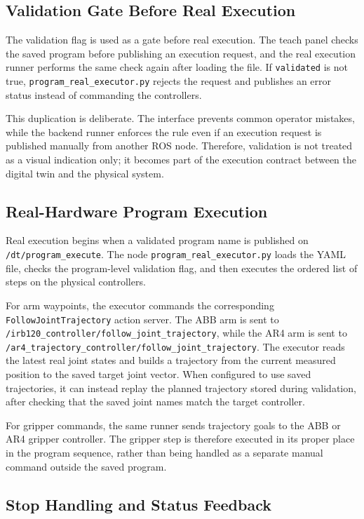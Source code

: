 \subsection{Validation Gate Before Real Execution}

The validation flag is used as a gate before real execution. The teach panel checks the saved program before publishing an execution request, and the real execution runner performs the same check again after loading the file. If \texttt{validated} is not true, \texttt{program\_real\_executor.py} rejects the request and publishes an error status instead of commanding the controllers.

This duplication is deliberate. The interface prevents common operator mistakes, while the backend runner enforces the rule even if an execution request is published manually from another ROS node. Therefore, validation is not treated as a visual indication only; it becomes part of the execution contract between the digital twin and the physical system.

\subsection{Real-Hardware Program Execution}

Real execution begins when a validated program name is published on \texttt{/dt/program\_execute}. The node \texttt{program\_real\_executor.py} loads the YAML file, checks the program-level validation flag, and then executes the ordered list of steps on the physical controllers.

For arm waypoints, the executor commands the corresponding \texttt{FollowJointTrajectory} action server. The ABB arm is sent to \texttt{/irb120\_controller/follow\_joint\_trajectory}, while the AR4 arm is sent to \texttt{/ar4\_trajectory\_controller/follow\_joint\_trajectory}. The executor reads the latest real joint states and builds a trajectory from the current measured position to the saved target joint vector. When configured to use saved trajectories, it can instead replay the planned trajectory stored during validation, after checking that the saved joint names match the target controller.

For gripper commands, the same runner sends trajectory goals to the ABB or AR4 gripper controller. The gripper step is therefore executed in its proper place in the program sequence, rather than being handled as a separate manual command outside the saved program.

\subsection{Stop Handling and Status Feedback}

